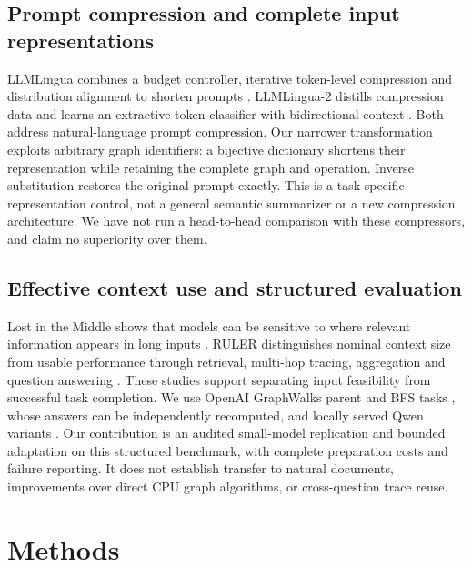 \subsection{Prompt compression and complete input representations}
LLMLingua combines a budget controller, iterative token-level compression and distribution alignment to shorten prompts \citep{jiang2023llmlingua}. LLMLingua-2 distills compression data and learns an extractive token classifier with bidirectional context \citep{pan2024llmlingua2}. Both address natural-language prompt compression. Our narrower transformation exploits arbitrary graph identifiers: a bijective dictionary shortens their representation while retaining the complete graph and operation. Inverse substitution restores the original prompt exactly. This is a task-specific representation control, not a general semantic summarizer or a new compression architecture. We have not run a head-to-head comparison with these compressors, and claim no superiority over them.

\subsection{Effective context use and structured evaluation}
Lost in the Middle shows that models can be sensitive to where relevant information appears in long inputs \citep{liu2024lost}. RULER distinguishes nominal context size from usable performance through retrieval, multi-hop tracing, aggregation and question answering \citep{hsieh2024ruler}. These studies support separating input feasibility from successful task completion. We use OpenAI GraphWalks parent and BFS tasks \citep{openai2025graphwalks}, whose answers can be independently recomputed, and locally served Qwen variants \citep{yang2025qwen3,qwen2026qwen35card}. Our contribution is an audited small-model replication and bounded adaptation on this structured benchmark, with complete preparation costs and failure reporting. It does not establish transfer to natural documents, improvements over direct CPU graph algorithms, or cross-question trace reuse.

\section{Methods}
\label{sec:migration-contract}

